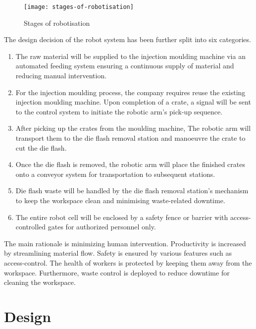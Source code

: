 \begin{figure}[htbp]
   \centering
   \texttt{[image: stages-of-robotisation]}
   \caption{Stages of robotisation \cite{ref:robot-cell-design-principles}}
   \label{fig:stages-of-robotisation}
\end{figure}

The design decision of the robot system has been further split into six categories.
\begin{enumerate}[label=(\arabic*), align=left, leftmargin=\parindent, labelwidth=\parindent]
   \item The raw material will be supplied to the injection moulding machine via an automated feeding system ensuring a continuous supply of material and reducing manual intervention.

   \item For the injection moulding process, the company requires reuse the existing injection moulding machine. Upon completion of a crate, a signal will be sent to the control system to initiate the robotic arm's pick-up sequence.

   \item After picking up the crates from the moulding machine, The robotic arm will transport them to the die flash removal station and manoeuvre the crate to cut the die flash.

   \item Once the die flash is removed, the robotic arm will place the finished crates onto a conveyor system for transportation to subsequent stations.

   \item Die flash waste will be handled by the die flash removal station's mechanism to keep the workspace clean and minimising waste-related downtime.

   \item The entire robot cell will be enclosed by a safety fence or barrier with access-controlled gates for authorized personnel only.
\end{enumerate}

The main rationale is minimizing human intervention. Productivity is increased by streamlining material flow. Safety is ensured by various features such as access-control. The health of workers is protected by keeping them away from the workspace. Furthermore, waste control is deployed to reduce downtime for cleaning the workspace.

\section{Design}

